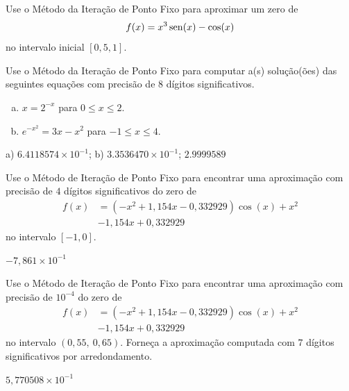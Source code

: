 \begin{exer}
  Use o Método da Iteração de Ponto Fixo para aproximar um zero de
  \begin{equation}
    f(x)=x^3\operatorname{sen}(x)-\cos(x)
  \end{equation}
  no intervalo inicial $[0,5, 1]$.
\end{exer}

\begin{exer}
  Use o Método da Iteração de Ponto Fixo para computar a(s) solução(ões) das seguintes equações com precisão de 8 dígitos significativos.
  \begin{enumerate}[a)]
  \item $x = 2^{-x}$ para $0\leq x \leq 2$.
  \item $e^{-x^2} = 3x - x^2$ para $-1\leq x\leq 4$.
  \end{enumerate}
\end{exer}
\begin{resp}
  a) $6.4118574\times 10^{-1}$; b) $3.3536470\times 10^{-1}$; $2.9999589$
\end{resp}

\begin{exer}
  Use o Método de Iteração de Ponto Fixo para encontrar uma aproximação com precisão de $4$ dígitos significativos do zero de 
  \begin{equation}
    \begin{aligned}
      f(x) &= (-x^2+1,154x-0,332929)\cos(x) + x^2 \\
      &- 1,154x + 0,332929
  \end{aligned}
  \end{equation}
  no intervalo $[-1, 0]$.
\end{exer}
\begin{resp}
  $-7,861\times 10^{-1}$
\end{resp}

\begin{exer}
  Use o Método de Iteração de Ponto Fixo para encontrar uma aproximação com precisão de $10^{-4}$ do zero de
  \begin{equation}
    \begin{aligned}
      f(x) &= (-x^2+1,154x-0,332929)\cos(x) + x^2\\
      &- 1,154x + 0,332929
  \end{aligned}
  \end{equation}
no intervalo $(0,55, ~0,65)$. Forneça a aproximação computada com $7$ dígitos significativos por arredondamento.
\end{exer}
\begin{resp}
  $5,770508\times 10^{-1}$
\end{resp}

